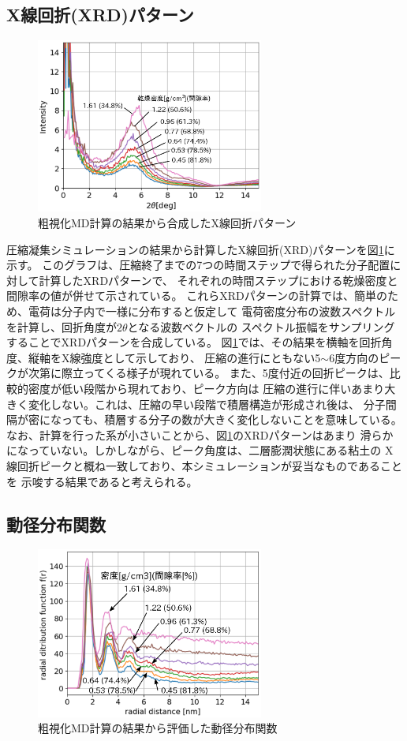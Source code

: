﻿\documentclass[11pt,a4j]{jarticle}
\begin{document}
\subsection{X線回折(XRD)パターン}
\begin{figure}
	\centering
	\includegraphics[keepaspectratio,width=75mm]{Figs/xrd.eps}
	\caption{粗視化MD計算の結果から合成したX線回折パターン}
	\label{fig:fig3}
\end{figure}
圧縮凝集シミュレーションの結果から計算したX線回折(XRD)パターンを図\ref{fig:fig3}に示す。
このグラフは、圧縮終了までの7つの時間ステップで得られた分子配置に対して計算したXRDパターンで、
それぞれの時間ステップにおける乾燥密度と間隙率の値が併せて示されている。
これらXRDパターンの計算では、簡単のため、電荷は分子内で一様に分布すると仮定して
電荷密度分布の波数スペクトルを計算し、回折角度が$2\theta$となる波数ベクトルの
スペクトル振幅をサンプリングすることでXRDパターンを合成している。
図\ref{fig:fig3}では、その結果を横軸を回折角度、縦軸をX線強度として示しており、
圧縮の進行にともない5$\sim$6度方向のピークが次第に際立ってくる様子が現れている。
また、5度付近の回折ピークは、比較的密度が低い段階から現れており、ピーク方向は
圧縮の進行に伴いあまり大きく変化しない。これは、圧縮の早い段階で積層構造が形成され後は、
分子間隔が密になっても、積層する分子の数が大きく変化しないことを意味している。
なお、計算を行った系が小さいことから、図\ref{fig:fig3}のXRDパターンはあまり
滑らかになっていない。しかしながら、ピーク角度は、二層膨潤状態にある粘土の
X線回折ピークと概ね一致しており、本シミュレーションが妥当なものであることを
示唆する結果であると考えられる。
\subsection{動径分布関数}
\begin{figure}
	\centering
	\includegraphics[keepaspectratio,width=75mm]{Figs/rdfs.eps}
	\caption{粗視化MD計算の結果から評価した動径分布関数}
	\label{fig:fig4}
\end{figure}
\end{document}
